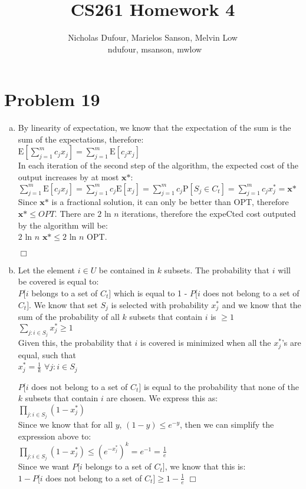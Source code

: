 \documentclass{article}[12pt]
\title{CS261 Homework 4}
\author{Nicholas Dufour, Marielos Sanson, Melvin Low \\\ {ndufour, msanson, mwlow}}
\newenvironment{proof}{{\bf Proof.  }}{\hfill$\Box$}
\begin{document}
\maketitle

\section{Problem 19}
\begin{enumerate}[(a)]
\item
\begin{proof}
By linearity of expectation, we know that the expectation of the sum is the sum of the expectations, therefore:\\
$\mathrm{E}[\sum\limits_{j=1}^{m}c_jx_j] =\sum\limits_{j=1}^{m}\mathrm{E}[c_jx_j]  $\\
In each iteration of the second step of the algorithm, the expected cost of the output increases by at most $\textbf{x*}$:\\
$\sum\limits_{j=1}^{m}\mathrm{E}[c_jx_j] = \sum\limits_{j=1}^{m} c_j \mathrm{E} [x_j] = \sum\limits_{j=1}^{m} c_j \mathrm{P}[S_j \in C_t] = \sum\limits_{j=1}^{m} c_jx_{j}^* = \textbf{x*}$\\
Since $\textbf{x*}$ is a fractional solution, it can only be better than OPT, therefore $\textbf{x*} \leq OPT$. There are $2$ ln $n$ iterations, therefore the expeCted cost outputed by the algorithm will be:\\
$2$ ln $n$ $\textbf{x*} \leq 2$  ln $n$ OPT.

\end{proof}
\item
\begin{proof}
Let the element $i \in U$ be contained in $k$ subsets. The probability that $i$ will be covered is equal to:\\
$P[i$ belongs to a set of $C_t]$ which is equal to 1 - $P[i$ does not belong to a set of $C_t]$.
We know that set $S_j$ is selected with probability $x_j^*$ and we know that the sum of the probability of all $k$ subsets that contain $i$ is $\geq 1$\\
$\sum\limits_{j: i\in S_j} x^*_j \geq 1$\\
Given this, the probability that $i$ is covered is minimized when all the $x^*_j$'s are equal, such that\\
$x^*_j = \frac{1}{k}$ $\forall j: i \in S_j$

$P[i$ does not belong to a set of $C_t]$ is equal to the probability that none of the $k$ subsets that contain $i$ are chosen. We express this as:\\
$\prod\limits_{j: i \in S_j}(1-x^*_j)$\\
Since we know that for all $y$, $(1-y) \leq e^{-y} $, then we can simplify the expression above to:\\
$\prod\limits_{j: i \in S_j}(1-x^*_j) \leq (e^{-x^*_j})^k = e^{-1} = \frac{1}{e}$\\
Since we want $P[i$ belongs to a set of $C_t]$, we know that this is:\\
$1 - P[i$ does not belong to a set of $C_t] \geq 1 - \frac{1}{e}$
\end{proof}


\end{enumerate}
\end{document}
